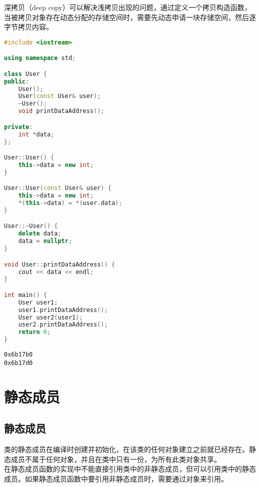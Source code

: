 深拷贝（deep copy）可以解决浅拷贝出现的问题，通过定义一个拷贝构造函数，当被拷贝对象存在动态分配的存储空间时，需要先动态申请一块存储空间，然后逐字节拷贝内容。\\


\begin{lstlisting}[language=C++]
#include <iostream>

using namespace std;

class User {
public:
    User();
    User(const User& user);
    ~User();
    void printDataAddress();

private:
    int *data;
};

User::User() {
    this->data = new int;
}

User::User(const User& user) {
    this->data = new int;
    *(this->data) = *(user.data);
}

User::~User() {
    delete data;
    data = nullptr;
}

void User::printDataAddress() {
    cout << data << endl;
}

int main() {
    User user1;
    user1.printDataAddress();
    User user2(user1);
    user2.printDataAddress();  
    return 0;
}
\end{lstlisting}

\begin{tcolorbox}
	\begin{verbatim}
0x6b17b0
0x6b17d0
	\end{verbatim}
\end{tcolorbox}

\newpage

\section{静态成员}

\subsection{静态成员}

类的静态成员在编译时创建并初始化，在该类的任何对象建立之前就已经存在。静态成员不属于任何对象，并且在类中只有一份，为所有此类对象共享。\\

在静态成员函数的实现中不能直接引用类中的非静态成员，但可以引用类中的静态成员。如果静态成员函数中要引用非静态成员时，需要通过对象来引用。\\


